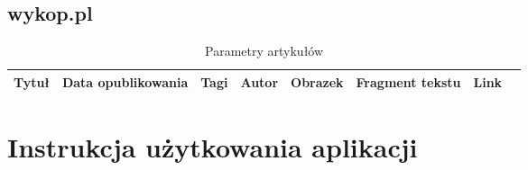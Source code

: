 \documentclass[12pt, titlepage]{article}
\begin{document}
		\subsection{wykop.pl} 
		\begin{table}[H]
			\centering
			\caption{Parametry artykułów}
			\label{wykop_parametry}
			\begin{tabular}{ | C{1.5cm} | C{4cm} | C{1.5cm} | C{1.5cm} | C{1.5cm} | C{3cm} | C{1.5cm} | @{}m{0pt}@{}}
				\hline
				Tytuł & Data opublikowania & Tagi & Autor & Obrazek & Fragment tekstu & Link &\\[0.5cm]
				\hline
			\end{tabular}
		\end{table}
	\section{Instrukcja użytkowania aplikacji}
	
\end{document}
